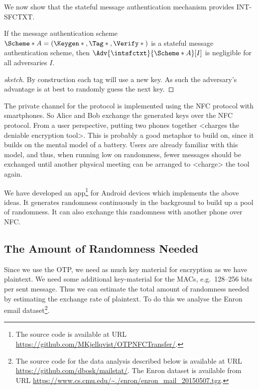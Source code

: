 We now show that the stateful message authentication mechanism provides 
\ac{INT-SFCTXT}.

\begin{theorem}
  If the message authentication scheme \(\Scheme*{A} = (\Keygen*{}, \Tag*{}, 
    \Verify*{})\) is a stateful message authentication scheme,
  then \(\Adv{\intsfctxt}{\Scheme*{A}}[I]\) is negligible for all adversaries 
  \(I\).
\end{theorem}
\begin{proof}[sketch]
  By construction each tag will use a new key.
  As such the adversary's advantage is at best to randomly guess the next key.
\end{proof}

The private channel for the protocol is implemented using the \ac{NFC} protocol 
with smartphones.
So Alice and Bob exchange the generated keys over the \ac{NFC} protocol.
From a user perspective, putting two phones together <charges the deniable 
encryption tool>.
This is probably a good metaphor to build on, since it builds on the mental 
model of a battery.
Users are already familiar with this model, and thus, when running low on 
randomness, fewer messages should be exchanged until another physical meeting 
can be arranged to <charge> the tool again.

We have developed an app\footnote{%
  The source code is available at URL 
  \url{https://github.com/MKjellqvist/OTPNFCTransfer/}.
} for Android devices which implements the above ideas.
It generates randomness continuously in the background to build up a pool of 
randomness.
It can also exchange this randomness with another phone over \ac{NFC}.

\subsection{The Amount of Randomness Needed}
\label{NeededRandomness}
Since we use the \ac{OTP}, we need as much key material for encryption as we 
have plaintext.
We need some additional key-material for the \acp{MAC}, e.g.~128--256 bits 
per sent message.
Thus we can estimate the total amount of randomness needed by estimating the 
exchange rate of plaintext.
To do this we analyse the Enron email dataset\footnote{%
  The source code for the data analysis described below is available at URL 
  \url{https://github.com/dbosk/mailstat/}.
  The Enron dataset is available from URL 
  \url{https://www.cs.cmu.edu/~./enron/enron_mail_20150507.tgz}.
}.

